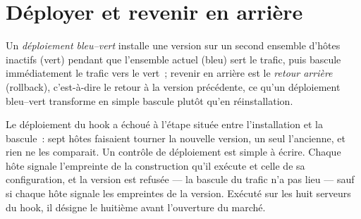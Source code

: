 \section{Déployer et revenir en arrière}

\begin{definition}\label{def:pl:testing-and-continuous-delivery:bluegreen}
Un \emph{déploiement bleu--vert} installe une version sur un second ensemble d'hôtes inactifs (vert) pendant que l'ensemble actuel
(bleu) sert le trafic, puis bascule immédiatement le trafic vers le vert~; revenir en arrière est le \emph{retour arrière} (rollback), c'est-à-dire le retour à la version précédente,
ce qu'un déploiement bleu--vert transforme en simple bascule plutôt qu'en réinstallation.
\end{definition}

Le déploiement du hook a échoué à l'étape située entre l'installation et la bascule~: sept hôtes faisaient tourner la nouvelle version, un seul l'ancienne, et rien ne
les comparait. Un contrôle de déploiement est simple à écrire. Chaque hôte signale l'empreinte de la construction qu'il exécute et celle de sa configuration, et la version
est refusée --- la bascule du trafic n'a pas lieu --- sauf si chaque hôte signale les empreintes de la version. Exécuté sur les huit serveurs du hook, il désigne
le huitième avant l'ouverture du marché.

\label{lst:pl:testing-and-continuous-delivery:check}

